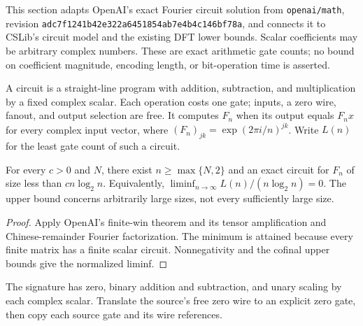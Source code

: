 This section adapts OpenAI's exact Fourier circuit solution from
\texttt{openai/math}, revision
\texttt{adc7f1241b42e322a6451854ab7e4b4c146bf78a}, and connects it to CSLib's
circuit model and the existing DFT lower bounds. Scalar coefficients may be
arbitrary complex numbers. These are exact arithmetic gate counts; no bound
on coefficient magnitude, encoding length, or bit-operation time is asserted.

\begin{definition}
  \label{def:circuits-exact-fourier}
  \leanok
  A circuit is a straight-line program with addition, subtraction, and
  multiplication by a fixed complex scalar. Each operation costs one gate;
  inputs, a zero wire, fanout, and output selection are free. It computes
  $F_n$ when its output equals $F_nx$ for every complex input vector, where
  $(F_n)_{jk}=\exp(2\pi i/n)^{jk}$. Write $L(n)$ for the least gate count of
  such a circuit.
\end{definition}

\begin{theorem}
  \label{thm:circuits-exact-fourier-source}
  \leanok
  For every $c>0$ and $N$, there exist $n\ge\max\{N,2\}$ and an exact
  circuit for $F_n$ of size less than $cn\log_2n$. Equivalently,
  $\liminf_{n\to\infty} L(n)/(n\log_2n)=0$.
  The upper bound concerns arbitrarily large sizes, not every sufficiently
  large size.
\end{theorem}
\begin{proof}
  \leanok
  Apply OpenAI's finite-win theorem and its tensor amplification and
  Chinese-remainder Fourier factorization. The minimum is attained because
  every finite matrix has a finite scalar circuit. Nonnegativity and the
  cofinal upper bounds give the normalized liminf.
\end{proof}

\begin{definition}
  \label{def:circuits-exact-fourier-cslib}
  \leanok
  The signature has zero, binary addition and subtraction, and unary scaling
  by each complex scalar. Translate the source's free zero wire to an
  explicit zero gate, then copy each source gate and its wire references.
\end{definition}


